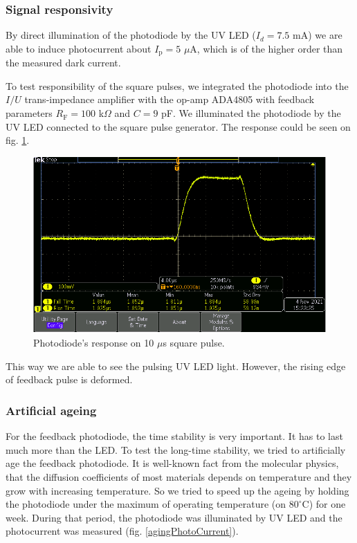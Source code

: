 \subsubsection{Signal responsivity}
By direct illumination of the photodiode by the UV LED ($I_d = 7.5 $ mA) we are able to induce photocurrent about $I_\textrm{p} = 5$ $\mu$A, which is of the higher order than the measured dark current.
\par
To test responsibility of the square pulses, we integrated the photodiode into the $I/U$ trans-impedance amplifier with the op-amp ADA4805 with feedback parameters $R_\textrm{F} = 100$ k$\Omega$ and $C = 9$ pF. We illuminated the photodiode by the UV LED connected to the square pulse generator. The response could be seen on fig. \ref{response}.

\begin{figure}[H]
 \centering
 \includegraphics[scale=0.5]{./pictures/pulse}
 \caption{Photodiode's response on 10 $\mu$s square pulse.}
 \label{response}
\end{figure}


This way we are able to see the pulsing UV LED light. However, the rising edge of feedback pulse is deformed. 

\subsubsection{Artificial ageing}
For the feedback photodiode, the time stability is very important. It has to last much more than the LED. To test the long-time stability, we tried to artificially age the feedback photodiode. It is well-known fact from the molecular physics, that the diffusion coefficients of most materials depends on temperature and they grow with increasing temperature. So we tried to speed up the ageing by holding the photodiode under the maximum of operating temperature (on $80^{\circ}$C) for one week. During that period, the photodiode was illuminated by UV LED and the photocurrent was measured (fig. \ref{agingPhotoCurrent}).


